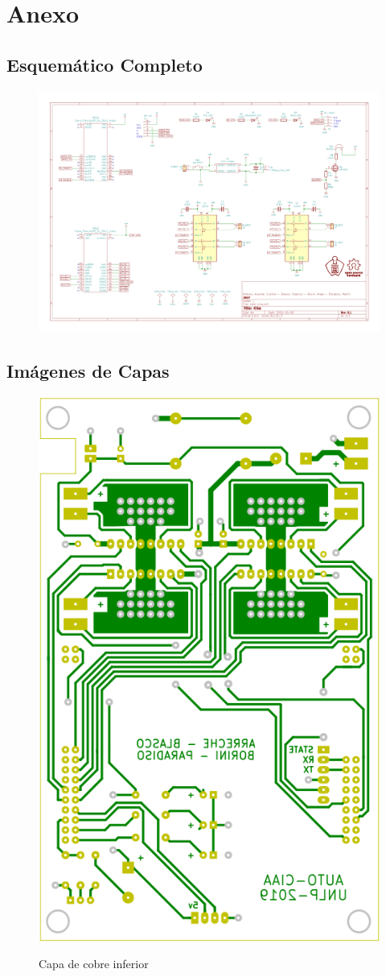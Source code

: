 \chapter{Anexo}

\section{Esquemático Completo}

\begin{figure}[H]
	\centering
	\includegraphics[width=0.85\textheight, angle=90]{informe_3/schem}
	\label{fig:schem}
\end{figure}

\section{Imágenes de Capas}

\begin{figure}[H]
	\centering
	\includegraphics[height=0.8\linewidth, angle=-90]{informe_4/capa_bg.png}
	\label{fig:capa_bg}
	\caption{Capa de cobre inferior}
\end{figure}

